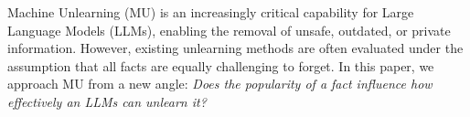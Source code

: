 



Machine Unlearning (MU) is an increasingly critical capability for Large Language Models (LLMs), enabling the removal of unsafe, outdated, or private information. However, existing unlearning methods are often evaluated under the assumption that all facts are equally challenging to forget. In this paper, we approach MU from a new angle: \textit{Does the popularity of a fact influence how effectively an LLMs can unlearn it?}

